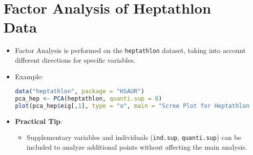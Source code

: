 \section{Factor Analysis of Heptathlon Data}
\begin{itemize}
    \item Factor Analysis is performed on the \texttt{heptathlon} dataset, taking into account different directions for specific variables.
    \item Example:
\begin{lstlisting}[language=R, breaklines=true]
data("heptathlon", package = "HSAUR")
pca_hep <- PCA(heptathlon, quanti.sup = 8)
plot(pca_hep$eig[,1], type = "o", main = "Scree Plot for Heptathlon Data")
\end{lstlisting}
\item \textbf{Practical Tip}:
    \begin{itemize}
        \item Supplementary variables and individuals (\texttt{ind.sup}, \texttt{quanti.sup}) can be included to analyze additional points without affecting the main analysis.
    \end{itemize}
\end{itemize}
